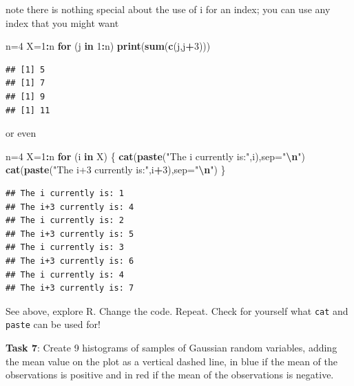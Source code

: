 \documentclass[
]{article}
\newenvironment{Shaded}{\begin{snugshade}}{\end{snugshade}}
\newcommand{\AttributeTok}[1]{\textcolor[rgb]{0.13,0.29,0.53}{#1}}
\newcommand{\ControlFlowTok}[1]{\textcolor[rgb]{0.13,0.29,0.53}{\textbf{#1}}}
\newcommand{\DecValTok}[1]{\textcolor[rgb]{0.00,0.00,0.81}{#1}}
\newcommand{\FunctionTok}[1]{\textcolor[rgb]{0.13,0.29,0.53}{\textbf{#1}}}
\newcommand{\NormalTok}[1]{#1}
\newcommand{\OtherTok}[1]{\textcolor[rgb]{0.56,0.35,0.01}{#1}}
\newcommand{\SpecialCharTok}[1]{\textcolor[rgb]{0.81,0.36,0.00}{\textbf{#1}}}
\newcommand{\StringTok}[1]{\textcolor[rgb]{0.31,0.60,0.02}{#1}}
\begin{document}
note there is nothing special about the use of i for an index; you can
use any index that you might want

\begin{Shaded}
\begin{Highlighting}[]
\NormalTok{n}\OtherTok{=}\DecValTok{4}
\NormalTok{X}\OtherTok{=}\DecValTok{1}\SpecialCharTok{:}\NormalTok{n}
\ControlFlowTok{for}\NormalTok{ (j }\ControlFlowTok{in} \DecValTok{1}\SpecialCharTok{:}\NormalTok{n) }\FunctionTok{print}\NormalTok{(}\FunctionTok{sum}\NormalTok{(}\FunctionTok{c}\NormalTok{(j,j}\SpecialCharTok{+}\DecValTok{3}\NormalTok{)))}
\end{Highlighting}
\end{Shaded}

\begin{verbatim}
## [1] 5
## [1] 7
## [1] 9
## [1] 11
\end{verbatim}

or even

\begin{Shaded}
\begin{Highlighting}[]
\NormalTok{n}\OtherTok{=}\DecValTok{4}
\NormalTok{X}\OtherTok{=}\DecValTok{1}\SpecialCharTok{:}\NormalTok{n}
\ControlFlowTok{for}\NormalTok{ (i }\ControlFlowTok{in}\NormalTok{ X) \{}
  \FunctionTok{cat}\NormalTok{(}\FunctionTok{paste}\NormalTok{(}\StringTok{"The i currently is:"}\NormalTok{,i),}\AttributeTok{sep=}\StringTok{"}\SpecialCharTok{\textbackslash{}n}\StringTok{"}\NormalTok{)}
  \FunctionTok{cat}\NormalTok{(}\FunctionTok{paste}\NormalTok{(}\StringTok{"The i+3 currently is:"}\NormalTok{,i}\SpecialCharTok{+}\DecValTok{3}\NormalTok{),}\AttributeTok{sep=}\StringTok{"}\SpecialCharTok{\textbackslash{}n}\StringTok{"}\NormalTok{)}
\NormalTok{  \}}
\end{Highlighting}
\end{Shaded}

\begin{verbatim}
## The i currently is: 1
## The i+3 currently is: 4
## The i currently is: 2
## The i+3 currently is: 5
## The i currently is: 3
## The i+3 currently is: 6
## The i currently is: 4
## The i+3 currently is: 7
\end{verbatim}

See above, explore R. Change the code. Repeat. Check for yourself what
\texttt{cat} and \texttt{paste} can be used for!

\textbf{Task 7}: Create 9 histograms of samples of Gaussian random
variables, adding the mean value on the plot as a vertical dashed line,
in blue if the mean of the observations is positive and in red if the
mean of the observations is negative.
\end{document}
